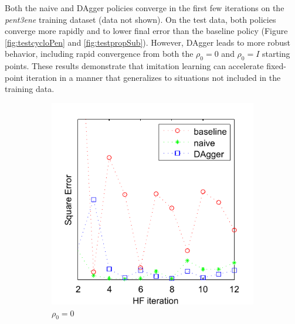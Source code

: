 \documentclass[twoside,11pt]{article}
\begin{document}
Both the naive and DAgger policies converge in the first few iterations on the \textit{pent3ene} training dataset (data not shown). On the test data, both policies converge more rapidly and to lower final error than the baseline policy (Figure \ref{fig:testcycloPen} and \ref{fig:testpropSub}). However, DAgger leads to more robust behavior, including rapid convergence from both the  $\rho_0 = 0$ and $\rho_0 = I$ starting points. These results demonstrate that imitation learning can accelerate fixed-point iteration in a manner that generalizes to situations not included in the training data.

\begin{figure}[h!]
\centering
\begin{subfigure}{.5\textwidth}
  \centering
  \includegraphics[scale=0.7]{propylsub_pzero_test_12iter_naive.pdf}
  \caption{$\rho_0 = 0$}
  \label{fig:propSub0}
\end{subfigure}%
\begin{subfigure}{.5\textwidth}
  \centering

\end{subfigure}
\end{figure}
\end{document}
